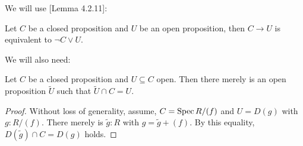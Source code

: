 
We will use \cite{draft}[Lemma 4.2.11]:

\begin{lemma}
  \label{closed-implies-open-to-or}
  Let $C$ be a closed proposition and $U$ be an open proposition,
  then $C\to U$ is equivalent to $\neg C \vee U$.
\end{lemma}

We will also need:

\begin{lemma}
  \label{commute-open-in-closed-prop}
  Let $C$ be a closed proposition and $U\subseteq C$ open.
  Then there merely is an open proposition $\tilde{U}$ such that $\tilde{U}\cap C = U$.
\end{lemma}

\begin{proof}
  Without loss of generality, assume, $C=\operatorname{Spec} R/(f)$ and $U=D(g)$ with $g:R/(f)$.
  There merely is $\tilde{g}:R$ with $g=\tilde{g}+(f)$.
  By this equality, $D(\tilde{g})\cap C = D(g)$ holds.
\end{proof}
